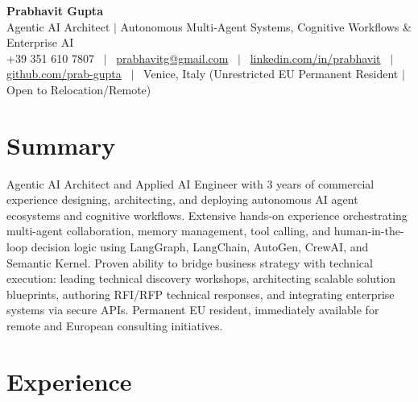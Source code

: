 \documentclass[a4paper,10pt]{article}
\begin{document}
\begin{minipage}[c]{0.80\textwidth}
  {\Huge\bfseries Prabhavit Gupta}\\[3pt]
  {\color{accent}\large Agentic AI Architect $\vert$ Autonomous Multi-Agent Systems, Cognitive Workflows \& Enterprise AI}\\[6pt]
  {\footnotesize +39 351 610 7807 ~$\vert$~
  \href{mailto:prabhavitg@gmail.com}{prabhavitg@gmail.com} ~$\vert$~
  \href{https://www.linkedin.com/in/prabhavit/}{linkedin.com/in/prabhavit} ~$\vert$~
  \href{https://github.com/prab-gupta}{github.com/prab-gupta} ~$\vert$~
  Venice, Italy (Unrestricted EU Permanent Resident $\vert$ Open to Relocation/Remote)}
\end{minipage}\hfill

\section{Summary}
Agentic AI Architect and Applied AI Engineer with 3 years of commercial experience designing, architecting, and deploying autonomous AI agent ecosystems and cognitive workflows. Extensive hands-on experience orchestrating multi-agent collaboration, memory management, tool calling, and human-in-the-loop decision logic using LangGraph, LangChain, AutoGen, CrewAI, and Semantic Kernel. Proven ability to bridge business strategy with technical execution: leading technical discovery workshops, architecting scalable solution blueprints, authoring RFI/RFP technical responses, and integrating enterprise systems via secure APIs. Permanent EU resident, immediately available for remote and European consulting initiatives.

\section{Experience}
\end{document}
